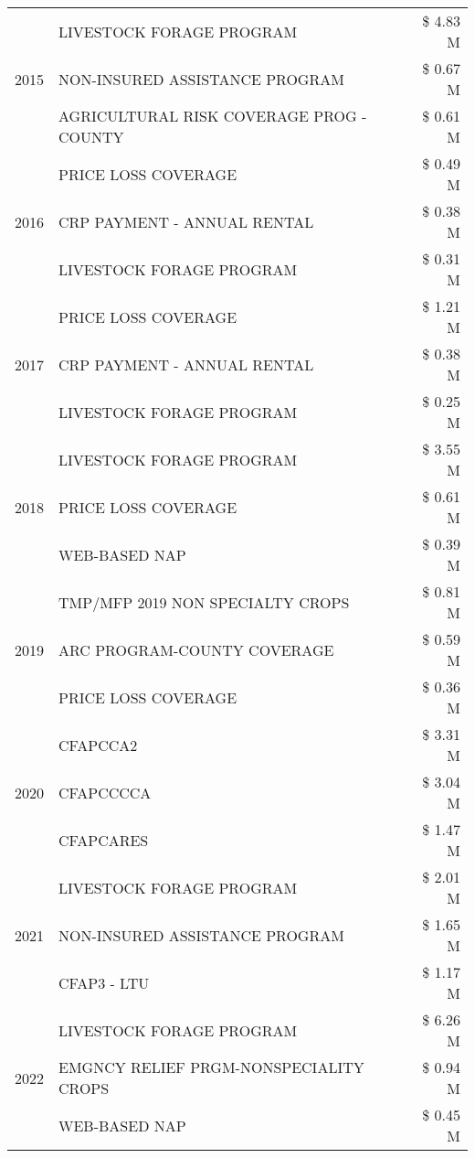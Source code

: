 \begin{tabular}{llr}
\cline{1-3}
\multirow[t]{3}{*}{2015} & LIVESTOCK FORAGE PROGRAM & \$ 4.83 M \\
 & NON-INSURED ASSISTANCE PROGRAM & \$ 0.67 M \\
 & AGRICULTURAL RISK COVERAGE PROG - COUNTY & \$ 0.61 M \\
\cline{1-3}
\multirow[t]{3}{*}{2016} & PRICE LOSS COVERAGE & \$ 0.49 M \\
 & CRP PAYMENT - ANNUAL RENTAL & \$ 0.38 M \\
 & LIVESTOCK FORAGE PROGRAM & \$ 0.31 M \\
\cline{1-3}
\multirow[t]{3}{*}{2017} & PRICE LOSS COVERAGE & \$ 1.21 M \\
 & CRP PAYMENT - ANNUAL RENTAL & \$ 0.38 M \\
 & LIVESTOCK FORAGE PROGRAM & \$ 0.25 M \\
\cline{1-3}
\multirow[t]{3}{*}{2018} & LIVESTOCK FORAGE PROGRAM & \$ 3.55 M \\
 & PRICE LOSS COVERAGE & \$ 0.61 M \\
 & WEB-BASED NAP & \$ 0.39 M \\
\cline{1-3}
\multirow[t]{3}{*}{2019} & TMP/MFP 2019 NON SPECIALTY CROPS & \$ 0.81 M \\
 & ARC PROGRAM-COUNTY COVERAGE & \$ 0.59 M \\
 & PRICE LOSS COVERAGE & \$ 0.36 M \\
\cline{1-3}
\multirow[t]{3}{*}{2020} & CFAPCCA2 & \$ 3.31 M \\
 & CFAPCCCCA & \$ 3.04 M \\
 & CFAPCARES & \$ 1.47 M \\
\cline{1-3}
\multirow[t]{3}{*}{2021} & LIVESTOCK FORAGE PROGRAM & \$ 2.01 M \\
 & NON-INSURED ASSISTANCE PROGRAM & \$ 1.65 M \\
 & CFAP3 - LTU & \$ 1.17 M \\
\cline{1-3}
\multirow[t]{3}{*}{2022} & LIVESTOCK FORAGE PROGRAM & \$ 6.26 M \\
 & EMGNCY RELIEF PRGM-NONSPECIALITY CROPS & \$ 0.94 M \\
 & WEB-BASED NAP & \$ 0.45 M \\
\cline{1-3}
\bottomrule
\end{tabular}
